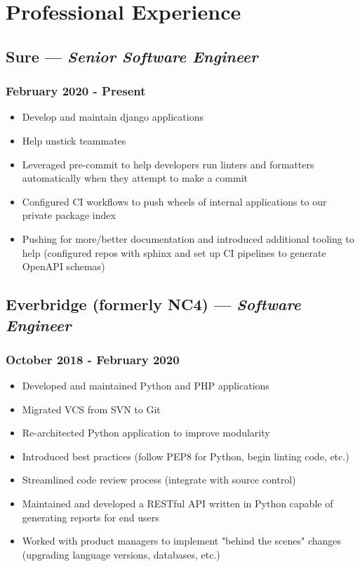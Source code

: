 \documentclass{article}
\begin{document}
\begin{minipage}[t]{.8\textwidth}
\section*{Professional Experience}
\subsection*{Sure  --- \textit{Senior Software Engineer}}
\subsubsection*{February 2020 - Present}
\begin{itemize}
    \item Develop and maintain django applications
    \item Help unstick teammates
    \item Leveraged pre-commit to help developers run linters and formatters automatically when they attempt to make a commit
    \item Configured CI workflows to push wheels of internal applications to our private package index
    \item Pushing for more/better documentation and introduced additional tooling to help (configured repos with sphinx and set up CI pipelines to generate OpenAPI schemas)
\end{itemize}
\subsection*{Everbridge (formerly NC4) --- \textit{Software Engineer}}
\subsubsection*{October 2018 - February 2020}
\begin{itemize}
    \item Developed and maintained Python and PHP applications
    \item Migrated VCS from SVN to Git
    \item Re-architected Python application to improve modularity
    \item Introduced best practices (follow PEP8 for Python, begin linting code, etc.)
    \item Streamlined code review process (integrate with source control)
    \item Maintained and developed a RESTful API written in Python capable of generating reports for end users
    \item Worked with product managers to implement "behind the scenes" changes (upgrading language versions, databases, etc.)
\end{itemize}

\end{minipage}
\end{document}
